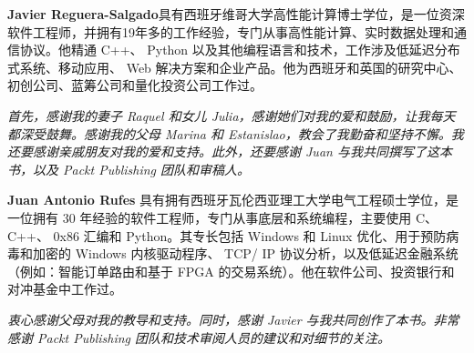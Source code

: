 \textbf{Javier Reguera-Salgado}具有西班牙维哥大学高性能计算博士学位，是一位资深软件工程师，并拥有19年多的工作经验，专门从事高性能计算、实时数据处理和通信协议。他精通 C++、 Python 以及其他编程语言和技术，工作涉及低延迟分布式系统、移动应用、 Web 解决方案和企业产品。他为西班牙和英国的研究中心、初创公司、蓝筹公司和量化投资公司工作过。

\hspace*{\fill}

\textit{
首先，感谢我的妻子 Raquel 和女儿 Julia，感谢她们对我的爱和鼓励，让我每天都深受鼓舞。感谢我的父母 Marina 和 Estanislao，教会了我勤奋和坚持不懈。我还要感谢亲戚朋友对我的爱和支持。此外，还要感谢 Juan 与我共同撰写了这本书，以及 Packt Publishing 团队和审稿人。
}

\hspace*{\fill}

\textbf{Juan Antonio Rufes} 具有拥有西班牙瓦伦西亚理工大学电气工程硕士学位，是一位拥有 30 年经验的软件工程师，专门从事底层和系统编程，主要使用 C、 C++、 0x86 汇编和 Python。其专长包括 Windows 和 Linux 优化、用于预防病毒和加密的 Windows 内核驱动程序、 TCP/ IP 协议分析，以及低延迟金融系统（例如：智能订单路由和基于 FPGA 的交易系统）。他在软件公司、投资银行和对冲基金中工作过。

\hspace*{\fill}

\textit{
衷心感谢父母对我的教导和支持。同时，感谢 Javier 与我共同创作了本书。非常感谢 Packt Publishing 团队和技术审阅人员的建议和对细节的关注。
}